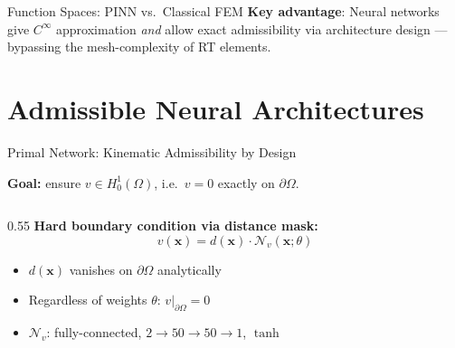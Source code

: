 \documentclass[10pt,aspectratio=169]{beamer}
\begin{document}
\begin{frame}{Function Spaces: PINN vs.\ Classical FEM}
  \medskip
  \small
  \textbf{Key advantage}: Neural networks give $C^\infty$ approximation
  \emph{and} allow exact admissibility via architecture design —
  bypassing the mesh-complexity of RT elements.
\end{frame}

\section{Admissible Neural Architectures}

\begin{frame}{Primal Network: Kinematic Admissibility by Design}

  \textbf{Goal:} ensure $v \in H^1_0(\Omega)$,
  i.e.\ $v = 0$ exactly on $\partial\Omega$.

  \begin{columns}[T]
    \begin{column}{0.55\textwidth}
      \textbf{Hard boundary condition via distance mask:}
      \[
        v(\mathbf{x}) = d(\mathbf{x}) \cdot \mathcal{N}_v(\mathbf{x};\theta)
      \]
      \begin{itemize}
        \item $d(\mathbf{x})$ vanishes on $\partial\Omega$ analytically
        \item Regardless of weights $\theta$: $v|_{\partial\Omega} = 0$
        \item $\mathcal{N}_v$: fully-connected, $2\!\to\!50\!\to\!50\!\to\!1$, $\tanh$
      \end{itemize}


\end{column}
\end{columns}
\end{frame}
\end{document}
